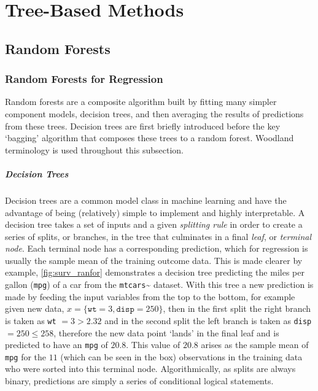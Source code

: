 \documentclass[
  letterpaper,
]{scrbook}
\let\oldparagraph\paragraph
\renewcommand{\paragraph}[1]{\oldparagraph{#1}\mbox{}}
\theoremstyle{plain}
\theoremstyle{definition}
\theoremstyle{remark}
\begin{document}

\hypertarget{tree-based-methods}{%
\chapter{Tree-Based Methods}\label{tree-based-methods}}

\section{Random Forests}
\label{sec:surv_ml_models_ranfor}

\subsection{Random Forests for Regression}

Random forests are a composite algorithm built by fitting many simpler
component models, decision trees, and then averaging the results of
predictions from these trees. Decision trees are first briefly
introduced before the key `bagging' algorithm that composes these trees
to a random forest. Woodland terminology is used throughout this
subsection.

\paragraph{Decision Trees}

Decision trees are a common model class in machine learning and have the
advantage of being (relatively) simple to implement and highly
interpretable. A decision tree takes a set of inputs and a given
\emph{splitting rule} in order to create a series of splits, or
branches, in the tree that culminates in a final \emph{leaf}, or
\emph{terminal node}. Each terminal node has a corresponding prediction,
which for regression is usually the sample mean of the training outcome
data. This is made clearer by example, \ref{fig:surv_ranfor}
demonstrates a decision tree predicting the miles per gallon
(\texttt{mpg}) of a car from the
\texttt{mtcars}\textasciitilde{}\cite{datamtcars} dataset. With this
tree a new prediction is made by feeding the input variables from the
top to the bottom, for example given new data,
\(x = \{\texttt{wt} = 3, \texttt{disp} = 250\}\), then in the first
split the right branch is taken as \texttt{wt} \(= 3 > 2.32\) and in the
second split the left branch is taken as \texttt{disp}
\(= 250 \leq 258\), therefore the new data point `lands' in the final
leaf and is predicted to have an \texttt{mpg} of \(20.8\). This value of
\(20.8\) arises as the sample mean of \texttt{mpg} for the \(11\) (which
can be seen in the box) observations in the training data who were
sorted into this terminal node. Algorithmically, as splits are always
binary, predictions are simply a series of conditional logical
statements.
\end{document}
